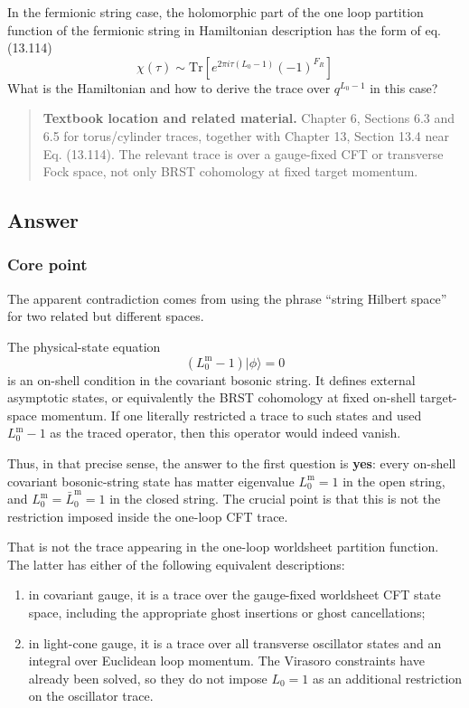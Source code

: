 \documentclass[
  10pt,
  a4paper,
  openany]{book}
\providecommand{\tightlist}{%
  \setlength{\itemsep}{0pt}\setlength{\parskip}{0pt}}
\begin{document}
In the fermionic string case, the holomorphic part of the one loop
partition function of the fermionic string in Hamiltonian description
has the form of eq. (13.114) \[
\chi(\tau)\sim \mathrm{Tr}[e^{2\pi i\tau(L_{0}-1)}(-1)^{F_{R}}]
\] What is the Hamiltonian and how to derive the trace over
\(q^{L_{0}-1}\) in this case?

\begin{quote}
\textbf{Textbook location and related material.} Chapter 6, Sections 6.3
and 6.5 for torus/cylinder traces, together with Chapter 13, Section
13.4 near Eq. (13.114). The relevant trace is over a gauge-fixed CFT or
transverse Fock space, not only BRST cohomology at fixed target
momentum.
\end{quote}

\subsection{Answer}\label{answer-20}

\subsubsection{Core point}\label{core-point-20}

The apparent contradiction comes from using the phrase ``string Hilbert
space'' for two related but different spaces.

The physical-state equation \[
(L_0^{\mathrm m}-1)|\phi\rangle=0
\] is an on-shell condition in the covariant bosonic string. It defines
external asymptotic states, or equivalently the BRST cohomology at fixed
on-shell target-space momentum. If one literally restricted a trace to
such states and used \(L_0^{\mathrm m}-1\) as the traced operator, then
this operator would indeed vanish.

Thus, in that precise sense, the answer to the first question is
\textbf{yes}: every on-shell covariant bosonic-string state has matter
eigenvalue \(L_0^{\mathrm m}=1\) in the open string, and
\(L_0^{\mathrm m}=\bar L_0^{\mathrm m}=1\) in the closed string. The
crucial point is that this is not the restriction imposed inside the
one-loop CFT trace.

That is not the trace appearing in the one-loop worldsheet partition
function. The latter has either of the following equivalent
descriptions:

\begin{enumerate}
\def\labelenumi{\arabic{enumi}.}
\tightlist
\item
  in covariant gauge, it is a trace over the gauge-fixed worldsheet CFT
  state space, including the appropriate ghost insertions or ghost
  cancellations;
\item
  in light-cone gauge, it is a trace over all transverse oscillator
  states and an integral over Euclidean loop momentum. The Virasoro
  constraints have already been solved, so they do not impose \(L_0=1\)
  as an additional restriction on the oscillator trace.
\end{enumerate}
\end{document}
